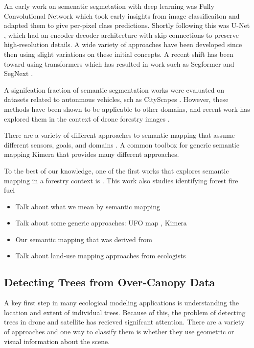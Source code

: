 An early work on semenatic segmetation with deep learning was Fully Convolutional Network \cite{Shelhamer2017FullySegmentation} which took early insights from image classificaiton and adapted them to give per-pixel class predictions. Shortly following this was U-Net \cite{RonnebergerUNET2015}, which had an encoder-decoder architecture with skip connections to preserve high-resolution details. A wide variety of approaches have been developed since then using slight variations on these initial concepts. A recent shift has been toward using transformers \cite{Vaswani2017AttentionNeed} which has resulted in work such as Segformer \cite{Xie2021} and SegNext \cite{Guo2022SegNeXt:Segmentation}.

A signifcation fraction of semantic segmentation works were evaluated on datasets related to autonmous vehicles, sch as CityScapes \cite{Cordts2016}. However, these methods have been shown to be applicable to other domains, and recent work has explored them in the context of drone forestry images \cite{Nogueira2017SemanticConvNets, Neves2020SemanticU}. 


There are a variety of different approaches to semantic mapping that assume different sensors, goals, and domains \cite{Kostavelis2015SemanticSurvey}.
A common toolbox for generic semantic mapping Kimera \cite{Rosinol2020} that provides many different approaches.

To the best of our knowledge, one of the first works that explores semantic mapping in a forestry context is \cite{Andrada2022IntegrationRoboticsb}. This work also studies identifying forest fire fuel   

\begin{itemize}
    \item Talk about what we mean by semantic mapping 
    \item Talk about some generic approaches: UFO map \cite{Duberg2020UFOMap:Unknown}, Kimera 
    \item Our semantic mapping \cite{RussellUnmannedMitigation} that was derived from \cite{semantic_slam_RGBD}
    \item Talk about land-use mapping approaches from ecologists \cite{Liu2018DeepClassification} 
\end{itemize}


\subsection{Detecting Trees from Over-Canopy Data}
A key first step in many ecological modeling applications is understanding the location and extent of individual trees. Because of this, the problem of detecting trees in drone and satellite has recieved signifcant attention. There are a variety of approaches and one way to classify them is whether they use geometric or visual information about the scene. 

